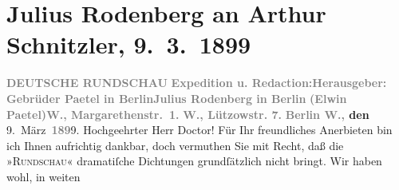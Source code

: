 

         
         \renewcommand{\erwaehntePersonen}{Personen: Elwin Paetel}
         \renewcommand{\erwaehnteInstitutionen}{Institutionen: Deutsche Rundschau, Gebrüder Paetel Verlag}
         \renewcommand{\erwaehnteOrte}{Orte: Berlin, Lützowstraße, Margaretenstraße, Wien}
         \renewcommand{\erwaehnteWerke}{Werke: Die Gefährtin. Schauspiel in einem Akt}
               \section[Julius Rodenberg an Arthur Schnitzler, 9. 3. 1899]{ Julius Rodenberg an Arthur Schnitzler, 9. 3. 1899}\nopagebreak{}\rehead{ }\begin{ledgroupsized}[t]{13cm}\normalsize\beginnumbering \toendnotes[C]{\smallbreak\pagebreak[2]} 
\toendnotes[C]{\smallbreak}\pstart
           \noindent{}\centering{}{\pb}\textcolor{gray}{\textbf{DEUTSCHE RUNDSCHAU}}\pend
           \pstart
           \noindent{}\textcolor{gray}{\textbf{Expedition u. Redaction:}}\hfill \textcolor{gray}{\textbf{Herausgeber:}}\pend
           \pstart
           \textcolor{gray}{\textbf{Gebrüder Paetel in Berlin}}\hfill \textcolor{gray}{\textbf{Julius Rodenberg in Berlin}}\pend
           \pstart
           \textcolor{gray}{\textbf{(Elwin Paetel)}}\hfill \textcolor{gray}{\textbf{W., Margarethenstr. 1.}}\pend
           \pstart
           \textcolor{gray}{\textbf{W., Lützowstr. 7.}}\pend
           \pstart
           \raggedleft{}\textbf{\textcolor{gray}{\textbf{Berlin W.,}} den}{ }9. März \textcolor{gray}{\textbf{189}}9.\pend
           \pstart{}Hochgeehrter Herr Doctor!\pend\pstart
           Für Ihr freundliches Anerbieten bin ich Ihnen aufrichtig dankbar, doch vermuthen Sie
               mit Recht, daß die »\textsc{Rundschau}« dramatiſche Dichtungen grundſätzlich nicht bringt. Wir haben wohl, in weiten

\end{ledgroupsized}

